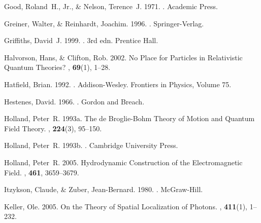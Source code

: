 \documentclass[12pt,secnumarabic,amsmath,amssymb,balancelastpage,nofootinbib]{article}
\begin{document}
\begin{thebibliography}{}
Good, Roland~H., Jr., \& Nelson, Terence~J. 1971.
.
\newblock Academic Press.

Greiner, Walter, \& Reinhardt, Joachim. 1996.
.
\newblock Springer-Verlag.

Griffiths, David~J. 1999.
. 3rd edn.
\newblock Prentice Hall.

Halvorson, Hans, \& Clifton, Rob. 2002.
\newblock No Place for Particles in Relativistic Quantum Theories?
, {\bf 69}(1), 1--28.

Hatfield, Brian. 1992.
.
\newblock Addison-Wesley.
\newblock Frontiers in Physics, Volume 75.

Hestenes, David. 1966.
.
\newblock Gordon and Breach.

Holland, Peter~R. 1993a.
\newblock The de Broglie-Bohm Theory of Motion and Quantum Field Theory.
, {\bf 224}(3), 95--150.

Holland, Peter~R. 1993b.
.
\newblock Cambridge University Press.

Holland, Peter~R. 2005.
\newblock Hydrodynamic Construction of the Electromagnetic Field.
, {\bf 461}, 3659--3679.

Itzykson, Claude, \& Zuber, Jean-Bernard. 1980.
.
\newblock McGraw-Hill.

Keller, Ole. 2005.
\newblock On the Theory of Spatial Localization of Photons.
, {\bf 411}(1), 1--232.


\end{thebibliography}
\end{document}

